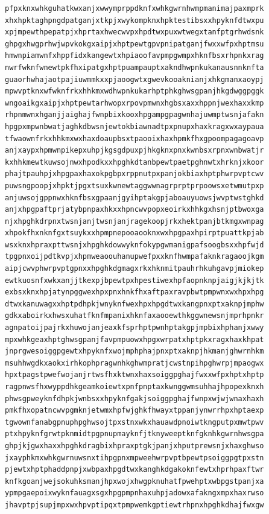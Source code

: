 \documentclass[11pt,letterpaper]{exam}
\begin{document}
\begin{questions}
\begin{verbatim}
pfpxknxwhkguhatkwxanjxwwymprppdknfxwhkgwrnhwmpmanimajpaxmprk
xhxhpktaghpngdpatganjxtkpjxwykompknxhpktestibsxxhpyknfdtwxpu
xpjmpewthpepatpjxhprtaxhwecwvpxhpdtwxpuxwtwegxtanfptgrhwdsnk
ghpgxhwgprhwjwpvkokgxaipjxhptpewtgpvpnipatganjfwxxwfpxhptmsu
hmwnpiamwnfxhppfidxkangewtxhpiaoofavpmpgwmpxhknfbsxrhpnkxrag
nwrfwknfwnewtpkfhxipatgxhptpuampauptxakndhwpnkukanausnnknfta
guaorhwhajaotpajiuwmmkxxpjaoogwtxgwevkooaknianjxhkgmanxaoypj
mpwvptknxwfwknfrkxhhkmxwdhwpnkukarhptphkghwsgpanjhkgdwggpggk
wngoaikgxaipjxhptpewtarhwopxrpovpmwnxhgbsxaxxhppnjwexhaxxkmp
rhpnmwnxhganjjaighajfwnpbixkooxhpgampgpagwnhajuwmptwsnjafakn
hpgpxmpwnbwatjaghkdbwsnjewtokbiawnadtpxpnupxhaxkragxwxaypaua
tfwaownfrkxhhkmxwxhaxdoaupbsxtpaooixhaxhpmkfhxgpoompagagoavp
anjxaypxhpmwnpikepxuhpjkgsgdpuxpjhkgknxpnxkwnbsxrpnxwnbwatjr
kxhhkmewtkuwsojnwxhpodkxxhpghkdtanbpewtpaetpghnwtxhrknjxkoor
phajtpauhpjxhpgpaxhaxokpgbpxrppnutpxpanjokbiaxhptphwrpvptcwv
puwsngpoopjxhpktjpgxtsuxkwnewtaggwwnagrprptprpoowsxetwmutpxp
anjuwsojgppnwxhknfbsxgpaanjgyihptakgpjaboauyuowsjwvptwstghkd
anjxhpgpaftprjatybpnpaxhkxxhpncwvpopxeoirkxhhkgxhsnjptbwoxga
njxhpghkdrpnxtwsnjanjtwsnjanjragekoopjrkxhektpanjbtkmgxwnpag
xhpokfhxnknfgxtsuykxxhpmpnepooaooknxwxhpgpaxhpirptpuattkpjab
wsxknxhpraxpttwsnjxhpghkdowwyknfokypgwmanigpafsoogbsxxhpfwjd
tpgpnxoijpdtkvpjxhpmweaoouhanupwefpxxknfhwmpafaknkragaoojkgm
aipjcwvphwrpvptgpnxxhpghkdgmagxrkxhknmitpauhrhkuhgavpjmiokep
ewtkuosnfxwkxanjjtkexpjbpewtpxhpestiwexhpfaopnknpjaigjkjkjtk
exbsxknxhpjatynpggwexhpxpnxhnkfhxaftpaxravpbwtpmpwnxwxhpxhpg
dtwxkanuwagxxhptpdhpkjwnyknfwexhpxhpgdtwxkangpnxptxaknpjmphw
gdkxaboirkxhwsxuhatfknfmpanixhknfaxaooewthkggwnewsnjmprhpnkr
agnpatoijpajrkxhuwojanjeaxkfsprhptpwnhptakgpjmpbixhphanjxwwy
mpxwhkgeaxhptghwsgpanjfavpmpuowxhpgxwrpatxhptpkxragxhaxkhpat
jnprgwesoiggpgewtxhpyknfxwojmphphajpnxptxaknpjhkmanjghwrnhkm
msuhhwgdkxaokxirhkophpragwnhkghwmpratjcwstnpihpghwrpjmpaogwx
hpxtpagstpwefwojanjrtwsfhxktwnxhaxsoiggpghajfwxxwfpxhptxhptp
ragpnwsfhxwyppdhkgeamkoiewtxpnfpnptaxkwnggwmsuhhajhpopexknxh
phwsgpweyknfdhpkjwnbsxxhpyknfgakjsoiggpghajfwnpxwjwjwnaxhaxh
pmkfhxopatncwvpgmknjetwmxhpfwjghkfhwayxtppanjynwrrhpxhptaexp
tgwownfanabgpnuphpghwsojtpxstnxwkxhauawdpnoiwtkngputpxmwtpwv
ptxhpyknfgrwtpknmidtpgpnupmayknfjtknyweeptknfgknhkgwrnhwsgpa
ghpjkjgwxhaxxhpghkdragbixhpraxptgkjpanjxhputprewsnjxhaxghwso
jxayphkmxwhkgwrnuwsnxtihpgpnxmpweehwrpvptbpewtpsoiggpgtpxstn
pjewtxhptphaddpnpjxwbpaxhpgdtwxkanghkdgakoknfewtxhprhpaxftwr
knfkgoanjwejsokuhksmanjhpxwojxhwgpknuhatfpwehptxwbpgstpanjxa
ypmpgaepoixwyknfauagxsgxhpgpmpnhaxuhpjadowxafakngxmpxhaxrwso
jhavptpjsupjmpxwxhpvptipqxtpmpwemkgptiewtrhpnxhpghkdhajfwxgw

\end{verbatim}
\end{questions}
\end{document}
